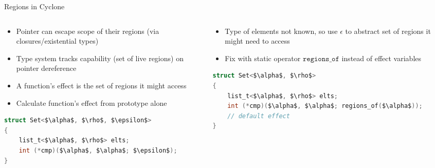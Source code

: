 \documentclass[aspectratio=169]{beamer}
\begin{document}
\begin{frame}[fragile]{Regions in Cyclone}
\footnotesize{
  \begin{columns}[T]
    \begin{column}{0.48\textwidth}
    \begin{itemize}
        \item Pointer can escape scope of their regions (via closures/existential types)
        \item Type system tracks \alert{capability} (set of live regions) on pointer dereference %
        \item A function's \alert{effect} is the set of regions it might access
        \item Calculate function's effect from prototype alone
    \end{itemize}
    \begin{lstlisting}[language=C,mathescape,basicstyle={\footnotesize\ttfamily}]
struct Set<$\alpha$, $\rho$, $\epsilon$>
{
    list_t<$\alpha$, $\rho$> elts;
    int (*cmp)($\alpha$, $\alpha$; $\epsilon$);
}
\end{lstlisting}
    \end{column}

\pause

    \begin{column}{0.48\textwidth}
        \begin{itemize}
        \item Type of elements not known, so use $\epsilon$ to abstract set of regions it might need to access
        \item Fix with static operator $\texttt{regions\_of}$ instead of effect variables %
        \end{itemize}
        \vspace{0.6in}
\begin{lstlisting}[language=C,mathescape,basicstyle={\footnotesize\ttfamily}]
struct Set<$\alpha$, $\rho$>
{
    list_t<$\alpha$, $\rho$> elts;
    int (*cmp)($\alpha$, $\alpha$; regions_of($\alpha$));
    // default effect
}
\end{lstlisting}
    \end{column}
  \end{columns}
  }
\end{frame}
\end{document}
